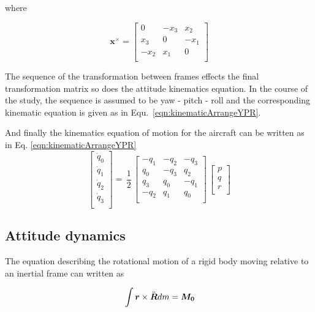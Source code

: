 where

\begin{equation}
\bm{x} ^ \times= \begin{bmatrix} 
0 & -x_3 & x_2 \\
x_3 & 0 & -x_1 \\
-x_2 & x_1 & 0 \\
 \end{bmatrix}
\end{equation}

The sequence of the transformation between frames effects the final transformation matrix so does the attitude kinematics equation. In the course of the study, the sequence is assumed to be yaw - pitch - roll and the corresponding kinematic equation is given as in Equ.~\ref{eqn:kinematicArrangeYPR}.

And finally the kinematics equation of motion for the aircraft can be written as in Eq. \ref{eqn:kinematicArrangeYPR}
\begin{equation} \label{eqn:kinematicArrangeYPR}
\begin{bmatrix}
\dot{q}_0\\[0.2em]
\dot{q}_1\\[0.2em]
\dot{q}_2\\[0.2em]
\dot{q}_3\\[0.2em]
\end{bmatrix}
 =\,
\frac{1}{2}
\,
\begin{bmatrix}
-q_1 & -q_2 & -q_3 \\
q_0 & -q_3 & q_2 \\
q_3 & q_0 & -q_1 \\
-q_2 & q_1 & q_0\\
\end{bmatrix}
\,
\begin{bmatrix}
p\\[0.2em]
q\\[0.2em]
r\\[0.2em]
\end{bmatrix} 
\end{equation}

\subsection{Attitude dynamics}

The equation describing the rotational motion of a rigid body moving relative to an inertial frame can written as \cite{wie2008space}

\begin{equation}{\label{eqn:kinematicEquDQM}}
\int \bm{r} \times \ddot{\bm{R}} dm = \bm{M_0}
\end{equation}

